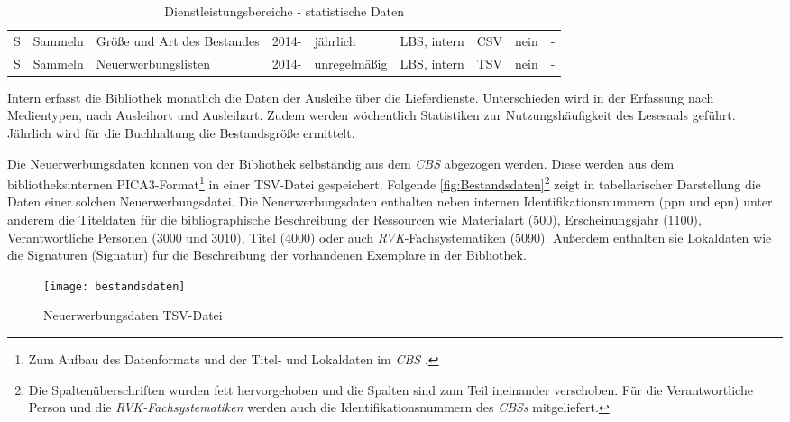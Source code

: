 \begin{table}[H]
\begin{adjustbox}{max width=\textwidth}
\begin{tabular}{p{}p{}p{}p{}p{}p{}p{}p{}p{}}
            S         &Sammeln                       & Größe und Art des Bestandes                   & 2014-             & jährlich          & LBS, intern  & CSV                       & nein  & -\\ 
            S         &Sammeln                       & Neuerwerbungslisten                           & 2014-             & unregelmäßig         & LBS, intern  & TSV                       & nein  & -\\ 
            

        \bottomrule
    \end{tabular}
    \end{adjustbox}
    \caption{%
        Dienstleistungsbereiche - statistische Daten
    \label{tab:Statistische_Daten}
    }
     \end{table}

\endgroup


Intern erfasst die Bibliothek monatlich die Daten der Ausleihe über die Lieferdienste. Unterschieden 
wird in der Erfassung nach Medientypen, nach Ausleihort und Ausleihart. Zudem werden wöchentlich 
Statistiken zur Nutzungshäufigkeit des Lesesaals geführt. Jährlich wird für die Buchhaltung die Bestandsgröße ermittelt.

Die Neuerwerbungsdaten können von der Bibliothek selbständig aus dem \textit{\acrshort{CBS}} abgezogen werden. Diese werden aus
dem bibliotheksinternen PICA3-Format\footnote{ Zum Aufbau des Datenformats und der Titel- und Lokaldaten im \textit{\acrlong{CBS}} \cite[vgl.][4]{hebis_datenstruktur_2017}.}
in einer TSV-Datei gespeichert. Folgende \autoref{fig:Bestandsdaten}\footnote{Die Spaltenüberschriften wurden fett hervorgehoben
und die Spalten sind zum Teil ineinander verschoben. Für die Verantwortliche Person und die \textit{\acrshort{RVK}-Fachsystematiken}
werden auch die Identifikationsnummern des \textit{\acrlong{CBS}s} mitgeliefert.} zeigt in tabellarischer Darstellung
die Daten einer solchen Neuerwerbungsdatei.
Die Neuerwerbungsdaten enthalten neben internen Identifikationsnummern (ppn und epn) unter anderem die Titeldaten für die bibliographische Beschreibung der Ressourcen wie
Materialart (500), Erscheinungsjahr (1100), Verantwortliche Personen (3000 und 3010), Titel (4000) oder auch \textit{\acrshort{RVK}}-Fachsystematiken (5090).
Außerdem enthalten sie Lokaldaten wie die Signaturen (Signatur) für die Beschreibung der vorhandenen Exemplare in der Bibliothek.

\begin{figure}[H]
    \centering
        \texttt{[image: bestandsdaten]}
        \caption{Neuerwerbungsdaten TSV-Datei}
        \label{fig:Bestandsdaten}
\end{figure}


